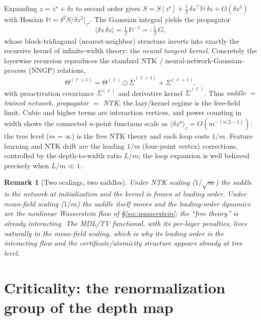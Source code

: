 \documentclass[11pt]{article}
\newtheorem{remark}{Remark}
\theoremstyle{definition}
\newcommand{\half}{\tfrac{1}{2}}
\begin{document}
Expanding $z=z^\star+\delta z$ to second order gives
$S=S[z^\star]+\half\,\delta z^\top\mathbb{H}\,\delta z+O(\delta z^3)$ with Hessian
$\mathbb{H}=\delta^2S/\delta z^2|_{z^\star}$. The Gaussian integral yields the propagator
\begin{equation}
\langle \delta z\,\delta z\rangle=\tfrac{1}{\beta}\,\mathbb{H}^{-1}=:\tfrac1\beta\,G,
\end{equation}
whose block-tridiagonal (nearest-neighbor) structure inverts into exactly the recursive
kernel of infinite-width theory: the \emph{neural tangent kernel}. Concretely the layerwise
recursion reproduces the standard NTK / neural-network-Gaussian-process (NNGP) relations,
\begin{equation}
\Theta^{(\ell+1)}=\Theta^{(\ell)}\odot\dot\Sigma^{(\ell+1)}+\Sigma^{(\ell+1)},
\label{eq:ntk-recursion}
\end{equation}
with preactivation covariance $\Sigma^{(\ell)}$ and derivative kernel $\dot\Sigma^{(\ell)}$.
Thus \emph{saddle $=$ trained network, propagator $=$ NTK}; the lazy/kernel regime is the
free-field limit. Cubic and higher terms are interaction vertices, and power counting in
width shows the connected $n$-point functions scale as
$\langle\delta z^{n}\rangle_c=O(m^{-(n/2-1)})$: the tree level ($m=\infty$) is the free NTK
theory and each loop costs $1/m$. Feature learning and NTK drift are the leading
$1/m$ (four-point vertex) corrections, controlled by the depth-to-width ratio $L/m$; the
loop expansion is well behaved precisely when $L/m\ll1$.

\begin{remark}[Two scalings, two saddles]
Under NTK scaling ($1/\sqrt m$) the saddle is the network at initialization and the kernel
is frozen at leading order. Under mean-field scaling ($1/m$) the saddle itself moves and
the leading-order dynamics are the nonlinear Wasserstein flow of \S\ref{sec:wasserstein};
the ``free theory'' is already interacting. The MDL/TV functional, with its per-layer
penalties, lives naturally in the mean-field scaling, which is why its leading order is the
interacting flow and the certificate/atomicity structure appears already at tree level.
\end{remark}


\section{Criticality: the renormalization group of the depth map}
\label{sec:criticality}
\end{document}
